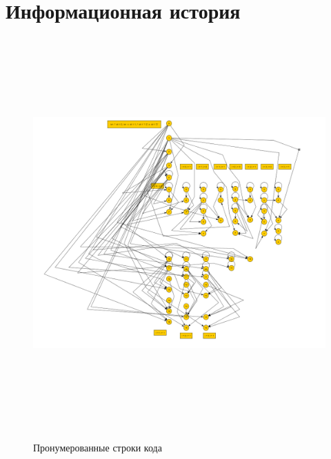 \documentclass[12pt]{report}
\begin{document}
	\section{Информационная история}
	
	\begin{figure}[H]	
	{\includegraphics[height = 15cm]{II.png}}
	\caption{Пронумерованные строки кода}
	\end{figure}
	
	
\end{document}
